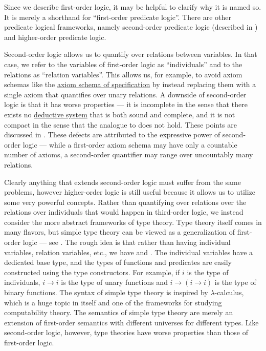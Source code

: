 \begin{remark}\label{rem:higher_order_logic}
  Since we describe first-order logic, it may be helpful to clarify why it is named so. It is merely a shorthand for \enquote{first-order predicate logic}. There are other predicate logical frameworks, namely second-order predicate logic (described in \cite[ch. 4]{VanDalen2004}) and higher-order predicate logic.

  Second-order logic allows us to quantify over relations between variables. In that case, we refer to the variables of first-order logic as \enquote{individuals} and to the relations as \enquote{relation variables}. This allows us, for example, to avoid axiom schemas like the \hyperref[def:zfc/specification]{axiom schema of specification} by instead replacing them with a single axiom that quantifies over unary relations. A downside of second-order logic is that it has worse properties --- it is incomplete in the sense that there exists no \hyperref[def:deductive_system]{deductive system} that is both sound and complete, and it is not compact in the sense that the analogue to  does not hold. These points are discussed in \cite[148]{VanDalen2004}. These defects are attributed to the expressive power of second-order logic --- while a first-order axiom schema may have only a countable number of axioms, a second-order quantifier may range over uncountably many relations.

  Clearly anything that extends second-order logic must suffer from the same problems, however higher-order logic is still useful because it allows us to utilize some very powerful concepts. Rather than quantifying over relations over the relations over individuals that would happen in third-order logic, we instead consider the more abstract frameworks of type theory. Type theory itself comes in many flavors, but simple type theory can be viewed as a generalization of first-order logic --- see \cite[thm. 2]{Farmer2008}. The rough idea is that rather than having individual variables, relation variables, etc., we have  and . The individual variables have a dedicated base type, and the types of functions and predicates are easily constructed using the type constructors. For example, if \( i \) is the type of individuals, \( i \rightarrow i \) is the type of unary functions and \( i \rightarrow (i \rightarrow i) \) is the type of binary functions. The syntax of simple type theory is inspired by \( \lambda \)-calculus, which is a huge topic in itself and one of the frameworks for studying computability theory. The semantics of simple type theory are merely an extension of first-order semantics with different universes for different types. Like second-order logic, however, type theories have worse properties than those of first-order logic.


\end{remark}
